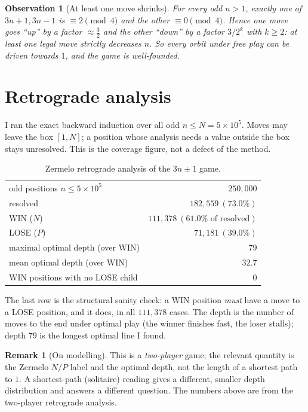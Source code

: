 \documentclass[11pt,a4paper]{article}
\theoremstyle{plain}
\newtheorem{observation}[proposition]{Observation}
\theoremstyle{definition}
\newtheorem{remark}[proposition]{Remark}
\begin{document}
\begin{observation}[At least one move shrinks]\label{obs:down}
For every odd $n>1$, exactly one of $3n+1,3n-1$ is $\equiv2\pmod4$ and the other
$\equiv0\pmod4$. Hence one move goes ``up'' by a factor $\approx\tfrac32$ and the other
``down'' by a factor $3/2^{k}$ with $k\ge2$: at least one legal move strictly decreases $n$.
So every orbit under free play can be driven towards $1$, and the game is well-founded.
\end{observation}

\section{Retrograde analysis}

I ran the exact backward induction over all odd $n\le N=5\times10^{5}$. Moves may leave the
box $[1,N]$; a position whose analysis needs a value outside the box stays unresolved. This is
the coverage figure, not a defect of the method.

\begin{table}[ht]\centering
\begin{tabular}{l r}
\toprule
odd positions $n\le5\times10^{5}$ & $250{,}000$\\
resolved & $182{,}559\ (73.0\%)$\\
\quad WIN ($N$) & $111{,}378\ (61.0\%\text{ of resolved})$\\
\quad LOSE ($P$) & $71{,}181\ (39.0\%)$\\
maximal optimal depth (over WIN) & $79$\\
mean optimal depth (over WIN) & $32.7$\\
WIN positions with no LOSE child & $0$\\
\bottomrule
\end{tabular}
\caption{Zermelo retrograde analysis of the $3n\pm1$ game.}
\end{table}

\noindent The last row is the structural sanity check: a WIN position \emph{must} have a move
to a LOSE position, and it does, in all $111{,}378$ cases. The depth is the number of moves to
the end under optimal play (the winner finishes fast, the loser stalls); depth $79$ is the
longest optimal line I found.

\begin{remark}[On modelling]
This is a \emph{two-player} game; the relevant quantity is the Zermelo $N/P$ label and the
optimal depth, not the length of a shortest path to $1$. A shortest-path (solitaire) reading
gives a different, smaller depth distribution and answers a different question. The numbers
above are from the two-player retrograde analysis.
\end{remark}
\end{document}
